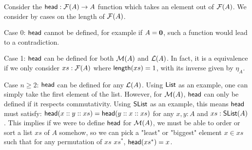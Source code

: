 Consider the $\operatorname{\mathsf{head}} : \mathcal{F}(A) \to A$ function which takes an element out of $\mathcal{F}(A)$.
We consider by cases on the length of $\mathcal{F}(A)$.

Case 0: $\operatorname{\mathsf{head}}$ cannot be defined, for example if $A = {\mathbf{0}}$, such a function would lead to
a contradiction.

Case 1: $\operatorname{\mathsf{head}}$ can be defined for both $\mathcal{M}(A)$ and $\mathcal{L}(A)$. In fact, it is a equivalence
if we only consider $xs : \mathcal{F}(A)$ where $\operatorname{\mathsf{length}}(xs) = 1$, with its inverse given by $\eta_A$.

Case $n \geq 2$: $\operatorname{\mathsf{head}}$ can be defined for any $\mathcal{L}(A)$. Using $\operatorname{\mathsf{List}}$ as an example, one can simply
take the first element of the list. However, for $\mathcal{M}(A)$, $\operatorname{\mathsf{head}}$ can only be defined if it
respects commutativity. Using $\operatorname{\mathsf{SList}}$ as an example, this means $\operatorname{\mathsf{head}}$ must satisfy:
$\operatorname{\mathsf{head}}(x :: y :: xs) = \operatorname{\mathsf{head}}(y :: x :: xs)$ for any $x, y : A$ and $xs : \operatorname{\mathsf{SList}}(A)$.
This implies if we were to define $\operatorname{\mathsf{head}}$ for $\mathcal{M}(A)$, we must be able to order or sort a
list $xs$ of $A$ somehow, so we can pick a "least" or "biggest" element $x \in xs$ such that for any
permutation of $xs$ $xs^*$, $\operatorname{\mathsf{head}}(xs^*) = x$.
